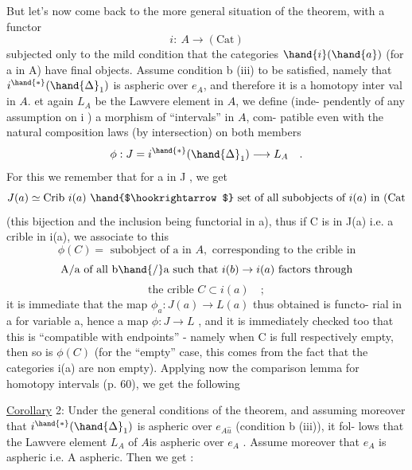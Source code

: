But let's now come back to the more general situation of the theorem,
with a functor
\[ i:\ A\longrightarrow(\mathrm{Cat}) \]
subjected only to the mild condition that the categories $\hand{i}(\hand{a})$ (for a in
A) have final objects.  Assume condition b (iii) to be satisfied, namely
that $i^{\hand{*}}(\hand{\Delta}_1)$ is aspheric over $e_{A\hat{}}$,  and therefore it is a homotopy inter%
val in $A\hat{}$.  et again $L_A$ be the Lawvere element in $A\hat{}$, we define (inde-%
pendently of any assumption on i ) a morphism of ``intervals'' in $A\hat{}$,  com-%
patible even with the natural composition laws (by intersection) on both
members
\[ \phi : J = i^{\hand{*}}(\hand{\Delta}_1)\longrightarrow L_A \quad . \]
For this we remember that  for a in J , we get
\[ J(a)\simeq \mathrm{Crib}\ i(a) \ \hand{$\hookrightarrow$}\ \text{set of all subobjects of } i(a) \text{ in } (\mathrm{Cat} \]
(this bijection and the inclusion being functorial in a),  thus if C is
in J(a)  i.e. a crible in i(a),  we associate to this
\[ \phi(C) = \text{ subobject of a in } A\hat{}, \text{ corresponding to the crible in} \]
\[ \text{A/a of all b}\hand{/}\text{a such that } i(b)\to i(a) \text{ factors through} \]
\[ \text{the crible } C\subset i(a) \quad ; \]
it is immediate that the map  $\phi_a : J(a)\longrightarrow L(a)$  thus obtained is functo-%
rial in a for variable a,  hence a  map $\phi : J\longrightarrow L$ ,  and it is
immediately checked too that this is ``compatible with endpoints'' - namely
when C is full respectively empty,  then so is $\phi(C)$  (for the ``empty''
case,  this comes from the fact that the categories i(a) are non empty).
Applying now the comparison lemma for homotopy intervals (p. 60),  we get
the following

\uline{Corollary} 2:  Under the general conditions of the theorem,  and assuming
moreover that $i^{\hand{*}}(\hand{\Delta}_1)$ is aspheric over $e_{A\hat{u}}$ (condition b (iii)),  it fol-%
lows that the Lawvere element $L_A$ of $A\hat{}$is aspheric over $e_{A\hat{}}$ .  Assume
moreover that $e_{A\hat{}}$ is aspheric i.e. A aspheric.  Then we get :
